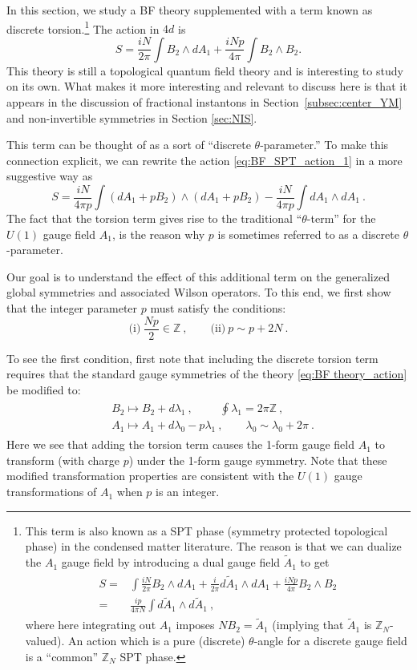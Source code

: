 \documentclass[11pt]{article}
\newcommand{\eq}[1]{\begin{align}\begin{split}#1\end{split}\end{align}}
\def\IZ{{\mathbb{Z}}}
\def\beq{\begin{equation}}
\def\eeq{\end{equation}}
\begin{document}
In this section, we study a BF theory supplemented with a term known as discrete torsion.\footnote{This term is also known as a SPT phase (symmetry protected topological phase) in the condensed matter literature. The reason is that we can dualize the $A_1$ gauge field by introducing a dual gauge field $\tilde{A}_1$ to get 
\eq{
S =&\int \frac{iN}{2\pi} B_2 \wedge d A_1 + \frac{i}{2\pi} d \tilde{A}_1 \wedge d A_1 + \frac{iNp}{4\pi} B_2 \wedge B_2 \\ 
=& \frac{ip}{4\pi N} \int d \tilde{A}_1 \wedge d \tilde{A}_1~, 
}
where here integrating out $A_1$ imposes $NB_2=\tilde{A}_1$ (implying that $\tilde{A}_1$ is $\IZ_N$-valued). 
An action which is a pure (discrete) $\theta$-angle for a discrete gauge field is a ``common'' $\IZ_N$ SPT phase. 
}
 The action in $4d$ is
%
\beq
S = \frac{iN}{2\pi} \int B_2 \wedge d A_1 + \frac{iNp}{4\pi} \int B_2 \wedge B_2.
\label{eq:BF_SPT_action_1}
\eeq
%
This theory is still a topological quantum field theory and is interesting to study on its own. What makes it more interesting and relevant to discuss here is that it appears in the discussion of fractional instantons in Section~\ref{subsec:center_YM} and non-invertible symmetries in Section \ref{sec:NIS}. 

This term can be thought of as a sort of ``discrete $\theta$-parameter.'' To make this connection explicit, we can rewrite the action  \eqref{eq:BF_SPT_action_1} in a more suggestive way as 
\beq
S = \frac{iN}{4\pi p} \int \left( dA_1 + p B_2 \right) \wedge \left( dA_1 + p B_2 \right) - \frac{iN}{4\pi p} \int dA_1 \wedge dA_1~.
\label{eq:BF_SPT_action_2}
\eeq
%
The fact that the torsion term gives rise to the traditional ``$\theta$-term'' for the $U(1)$ gauge field $A_1$, is the reason  why $p$  is sometimes referred to as a discrete $\theta$-parameter. 

Our goal is to understand the effect of this additional term on the generalized global symmetries and associated Wilson operators. To this end, we first show that the integer parameter $p$ must satisfy the conditions:
%
\beq
\text{(i)} ~ \frac{Np}{2} \in \IZ~,\qquad \text{(ii)} ~  p \sim p + 2N~.
\eeq
%

To see the first condition, first note that including the discrete torsion term requires that 
 the standard gauge symmetries of the theory \eqref{eq:BF theory_action} be modified to:
%
\eq{
& B_2 \longmapsto B_2 + d \lambda_1 ~, \hspace{1cm}\oint \lambda_1 = 2\pi \IZ~,\\
& A_1 \longmapsto A_1 + d \lambda_0 - p \lambda_1~, \quad\quad \lambda_0 \sim \lambda_0 + 2\pi~.\label{eq:BF_SPT_Transformations}
}
%
Here we see that adding the torsion term causes  the 1-form gauge field $A_1$ to transform (with charge $p$) under the 1-form gauge symmetry. 
Note that these modified transformation properties are consistent with the $U(1)$ gauge transformations of $A_1$ when $p$ is an integer. 
\end{document}
